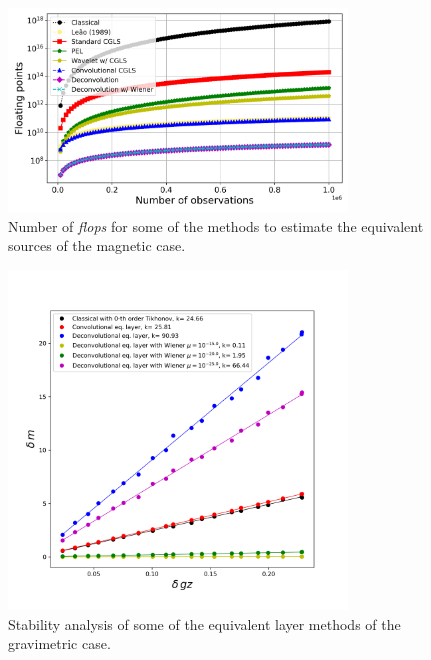 \begin{figure}[htbp]
	\begin{center}
		\includegraphics[width=9cm]{Fig/flops_mag}%
	\end{center}
	\caption{Number of \textit{flops} for some of the methods to estimate the equivalent sources of the magnetic case.}
	\label{fig:2}
\end{figure}

\begin{figure}[htbp]
	\begin{center}
		\includegraphics[width=9cm]{Fig/stability_grav}
	\end{center}
	\caption{Stability analysis of some of the equivalent layer methods of the gravimetric case.}
	\label{fig:3}
\end{figure}

